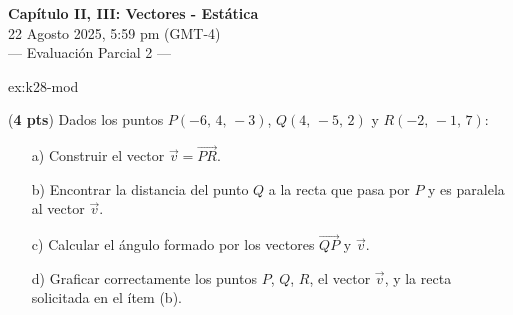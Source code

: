  \begin{multicols}{2}
   \begin{center}
         \LARGE{\textbf{Capítulo II, III: Vectores -  Estática}}\\	
         \vspace{0.2cm}
         \large{22 Agosto 2025, 5:59 pm (GMT-4)}\\
         \large{— Evaluación Parcial 2 —}
     \end{center}

    \begin{excercise}[][][]{ex:k28-mod}{(\textbf{4 pts})
        Dados los puntos  $P(-6,\,4,\,-3)$, $Q(4,\,-5,\,2)$ y $R(-2,\,-1,\,7)$:  
        \begin{itemize}
            \item[a)] Construir el vector $\vec{v}=\overrightarrow{PR}$.  
            \item[b)] Encontrar la distancia del punto $Q$ a la recta que pasa por $P$ y es paralela al vector $\vec{v}$.  
            \item[c)] Calcular el ángulo formado por los vectores $\vec{QP}$ y $\vec{v}$.  
            \item[d)] Graficar correctamente los puntos $P$, $Q$, $R$, el vector $\vec{v}$, y la recta solicitada en el ítem (b).  
        \end{itemize}
    }
    \end{excercise}


\end{multicols}
